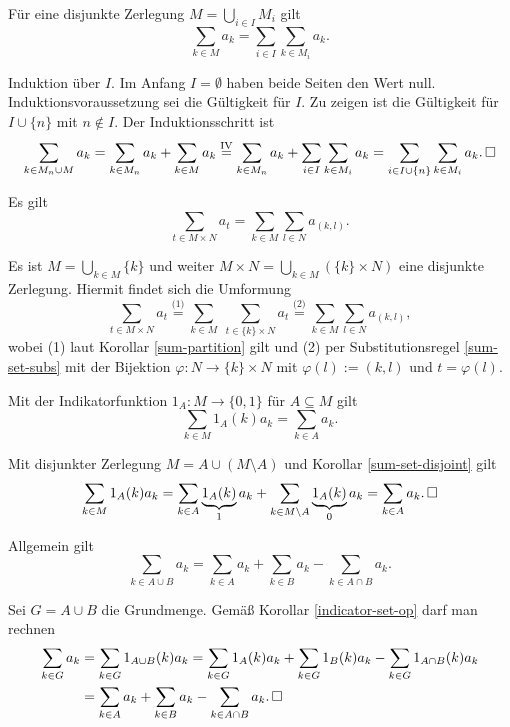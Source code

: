 \begin{Korollar}\label{sum-partition}
Für eine disjunkte Zerlegung $M = \bigcup_{i\in I} M_i$ gilt
\[\sum_{k\in M} a_k = \sum_{i\in I}\sum_{k\in M_i} a_k.\]
\end{Korollar}
\begin{Beweis}
Induktion über $I$. Im Anfang $I=\emptyset$ haben beide Seiten
den Wert null. Induktionsvoraussetzung sei die Gültigkeit
für $I$. Zu zeigen ist die Gültigkeit für $I\cup\{n\}$ mit $n\notin I$.
Der Induktionsschritt ist
\[\sum_{k\in M_n\cup M} a_k
= \sum_{k\in M_n} a_k + \sum_{k\in M} a_k
\stackrel{\mathrm{IV}}= \sum_{k\in M_n} a_k +
\sum_{i\in I}\sum_{k\in M_i} a_k
= \sum_{i\in I\cup\{n\}}\sum_{k\in M_i} a_k.\,\square\]
\end{Beweis}

\begin{Korollar}
Es gilt
\[\sum_{t\in M\times N} a_t = \sum_{k\in M}\sum_{l\in N} a_{(k,l)}.\]
\end{Korollar}
\begin{Beweis}
Es ist $M = \bigcup_{k\in M} \{k\}$ und weiter $M\times N =
\bigcup_{k\in M} (\{k\}\times N)$ eine disjunkte Zerlegung. Hiermit
findet sich die Umformung
\[\sum_{t\in M\times N} a_t
\stackrel{\text{(1)}}= \sum_{k\in M}\;\sum_{t\in \{k\}\times N} a_t
\stackrel{\text{(2)}}= \sum_{k\in M}\sum_{l\in N} a_{(k,l)},\]
wobei (1) laut Korollar \ref{sum-partition} gilt und (2) per Substitutionsregel
\ref{sum-set-subs} mit der Bijektion $\varphi\colon N\to\{k\}\times N$
mit $\varphi(l):=(k,l)$ und $t=\varphi(l)$.
\end{Beweis}

\begin{Korollar} Mit der Indikatorfunktion $1_A\colon M\to\{0,1\}$
für $A\subseteq M$ gilt
\[\sum_{k\in M} 1_A(k)a_k = \sum_{k\in A} a_k.\]
\end{Korollar}
\begin{Beweis}
Mit disjunkter Zerlegung $M=A\cup (M\setminus A)$
und Korollar \ref{sum-set-disjoint} gilt
\[\sum_{k\in M} 1_A(k)a_k = \sum_{k\in A} \underbrace{1_A(k)}_{1} a_k
+ \sum_{k\in M\setminus A}\underbrace{1_A(k)}_{0} a_k
= \sum_{k\in A} a_k.\,\square\]
\end{Beweis}

\begin{Korollar} Allgemein gilt
\[\sum_{k\in A\cup B} a_k = \sum_{k\in A} a_k + \sum_{k\in B} a_k
- \sum_{k\in A\cap B} a_k.\]
\end{Korollar}
\begin{Beweis} Sei $G=A\cup B$ die Grundmenge. Gemäß Korollar
\ref{indicator-set-op} darf man rechnen
\begin{align*}
\sum_{k\in G} a_k &= \sum_{k\in G} 1_{A\cup B}(k)a_k
= \sum_{k\in G} 1_A(k)a_k + \sum_{k\in G} 1_B(k)a_k
- \sum_{k\in G} 1_{A\cap B}(k)a_k\\
&= \sum_{k\in A} a_k + \sum_{k\in B} a_k - \sum_{k\in A\cap B} a_k.\,\square
\end{align*}
\end{Beweis}

